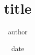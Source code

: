 \documentclass[11pt, letterpaper]{article}
\title{title}
\author{author}
\date{date}
\begin{document}
\maketitle

\begin{figure}[H]
\end{figure}

\end{document}
